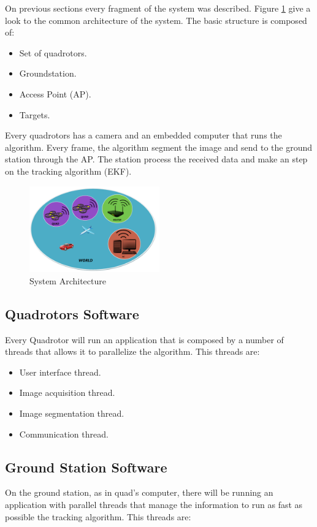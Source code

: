 On previous sections every fragment of the system was described. Figure \ref{fig:System_Architecture} give a look to the common architecture of the system. The basic structure is composed of:

\begin{itemize}
  \item Set of quadrotors.
  \item Groundstation.
  \item Access Point (AP).
  \item Targets.
\end{itemize}

Every quadrotors has a camera and an embedded computer that runs the algorithm. Every frame, the algorithm segment the image and send to the ground station through the AP. The station process the received data and make an step on the tracking algorithm (EKF).

\begin{figure}[hb]
	\centering
	\includegraphics[width=0.50\textwidth,natwidth=220,natheight=1467]{../Images/c2/Architecture.png}
	\caption{System Architecture}
	\label{fig:System_Architecture}
\end{figure}

\subsection{Quadrotors Software}
	Every Quadrotor will run an application that is composed by a number of threads that allows it to parallelize the algorithm. This threads are:
	
	\begin{itemize}
		\item User interface thread.
		\item Image acquisition thread.
		\item Image segmentation thread.
		\item Communication thread.
	\end{itemize}
	
\subsection{Ground Station Software}
	On the ground station, as in quad's computer, there will be running an application with parallel threads that manage the information to run as fast as possible the tracking algorithm. This threads are:
	
